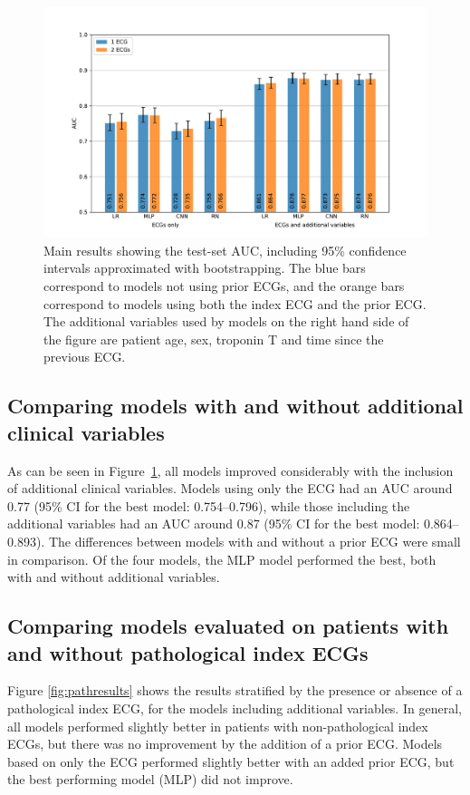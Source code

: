 \documentclass[preprint]{elsarticle}
\begin{document}
\begin{figure}[h!]
\includegraphics[width=\linewidth]{figures/main_results.pdf}
\caption{Main results showing the test-set AUC, including 95\% confidence intervals approximated with bootstrapping. The blue bars correspond to models not using prior ECGs, and the orange bars correspond to models using both the index ECG and the prior ECG. The additional variables used by models on the right hand side of the figure are patient age, sex, troponin T and time since the previous ECG.}
\label{fig:mainresults}
\end{figure}

\subsection{Comparing models with and without additional clinical variables}
As can be seen in Figure~\ref{fig:mainresults}, all models improved considerably with the inclusion of additional clinical variables. Models using only the ECG had an AUC around 0.77 (95\% CI for the best model: 0.754--0.796), while those including the additional variables had an AUC around 0.87 (95\% CI for the best model: 0.864--0.893). The differences between models with and without a prior ECG were small in comparison. Of the four models, the MLP model performed the best, both with and without additional variables.

\subsection{Comparing models evaluated on patients with and without pathological index ECGs}
Figure \ref{fig:pathresults} shows the results stratified by the presence or absence of a pathological index ECG, for the models including additional variables. In general, all models performed slightly better in patients with non-pathological index ECGs, but there was no improvement by the addition of a prior ECG. Models based on only the ECG performed slightly better with an added prior ECG, but the best performing model (MLP) did not improve. 
\end{document}
